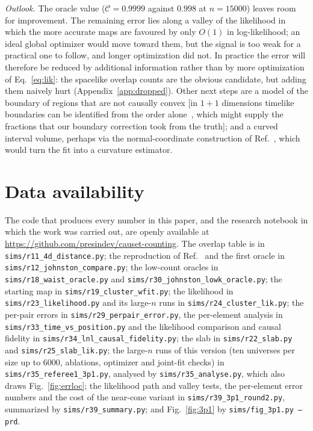 \documentclass[prd,twocolumn,superscriptaddress,nofootinbib,amsmath,amssymb,floatfix]{revtex4-2}
\begin{document}
\emph{Outlook.} The oracle value ($\mathcal C=0.9999$ against $0.998$ at $n=15000$) leaves room for improvement. The remaining error lies along a valley of the likelihood in which the more accurate maps are favoured by only $O(1)$ in log-likelihood; an ideal global optimizer would move toward them, but the signal is too weak for a practical one to follow, and longer optimization did not. In practice the error will therefore be reduced by additional information rather than by more optimization of Eq.~\eqref{eq:lik}: the spacelike overlap counts are the obvious candidate, but adding them naively hurt (Appendix~\ref{app:dropped}). Other next steps are a model of the boundary of regions that are not causally convex [in $1+1$ dimensions timelike boundaries can be identified from the order alone~\cite{Cunningham18}, which might supply the fractions that our boundary correction took from the truth]; and a curved interval volume, perhaps via the normal-coordinate construction of Ref.~\cite{Madsen26}, which would turn the fit into a curvature estimator.

\section*{Data availability}
The code that produces every number in this paper, and the research notebook in which the work was carried out, are openly available at \url{https://github.com/presindev/causet-counting}. The overlap table is in \texttt{sims/r11\_4d\_distance.py}; the reproduction of Ref.~\cite{Johnston25} and the first oracle in \texttt{sims/r12\_johnston\_compare.py}; the low-count oracles in \texttt{sims/r18\_waist\_oracle.py} and \texttt{sims/r30\_johnston\_lowk\_oracle.py}; the starting map in \texttt{sims/r19\_cluster\_wfit.py}; the likelihood in \texttt{sims/r23\_likelihood.py} and its large-$n$ runs in \texttt{sims/r24\_cluster\_lik.py}; the per-pair errors in \texttt{sims/r29\_perpair\_error.py}, the per-element analysis in \texttt{sims/r33\_time\_vs\_position.py} and the likelihood comparison and causal fidelity in \texttt{sims/r34\_lnl\_causal\_fidelity.py}; the slab in \texttt{sims/r22\_slab.py} and \texttt{sims/r25\_slab\_lik.py}; the large-$n$ runs of this version (ten universes per size up to $6000$, ablations, optimizer and joint-fit checks) in \texttt{sims/r35\_referee1\_3p1.py}, analysed by \texttt{sims/r35\_analyse.py}, which also draws Fig.~\ref{fig:errloc}; the likelihood path and valley tests, the per-element error numbers and the cost of the near-cone variant in \texttt{sims/r39\_3p1\_round2.py}, summarized by \texttt{sims/r39\_summary.py}; and Fig.~\ref{fig:3p1} by \texttt{sims/fig\_3p1.py --prd}.
\end{document}
